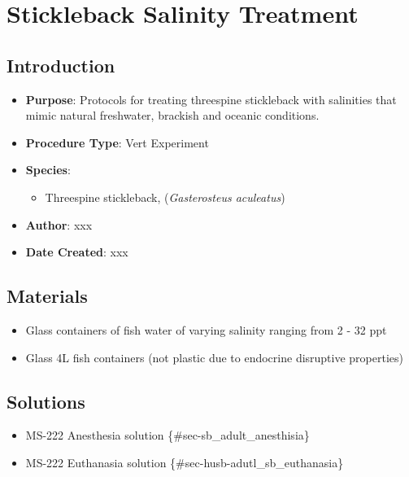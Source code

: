 \documentclass[
  letterpaper,
  DIV=11,
  numbers=noendperiod]{scrreprt}
\providecommand{\tightlist}{%
  \setlength{\itemsep}{0pt}\setlength{\parskip}{0pt}}\usepackage{longtable,booktabs,array}
\begin{document}
\hypertarget{sec-vert_exp_salinity_exp_SB}{%
\chapter{Stickleback Salinity
Treatment}\label{sec-vert_exp_salinity_exp_SB}}

\hypertarget{introduction-58}{%
\section{Introduction}\label{introduction-58}}

\begin{itemize}
\tightlist
\item
  \textbf{Purpose}: Protocols for treating threespine stickleback with
  salinities that mimic natural freshwater, brackish and oceanic
  conditions.
\item
  \textbf{Procedure Type}: Vert Experiment
\item
  \textbf{Species}:

  \begin{itemize}
  \tightlist
  \item
    Threespine stickleback, (\emph{Gasterosteus aculeatus})
  \end{itemize}
\item
  \textbf{Author}: xxx
\item
  \textbf{Date Created}: xxx
\end{itemize}

\hypertarget{materials-54}{%
\section{Materials}\label{materials-54}}

\begin{itemize}
\tightlist
\item
  Glass containers of fish water of varying salinity ranging from 2 - 32
  ppt
\item
  Glass 4L fish containers (not plastic due to endocrine disruptive
  properties)
\end{itemize}

\hypertarget{solutions-51}{%
\section{Solutions}\label{solutions-51}}

\begin{itemize}
\tightlist
\item
  MS-222 Anesthesia solution \{\#sec-sb\_adult\_anesthisia\}
\item
  MS-222 Euthanasia solution \{\#sec-husb-adutl\_sb\_euthanasia\}
\end{itemize}
\end{document}
